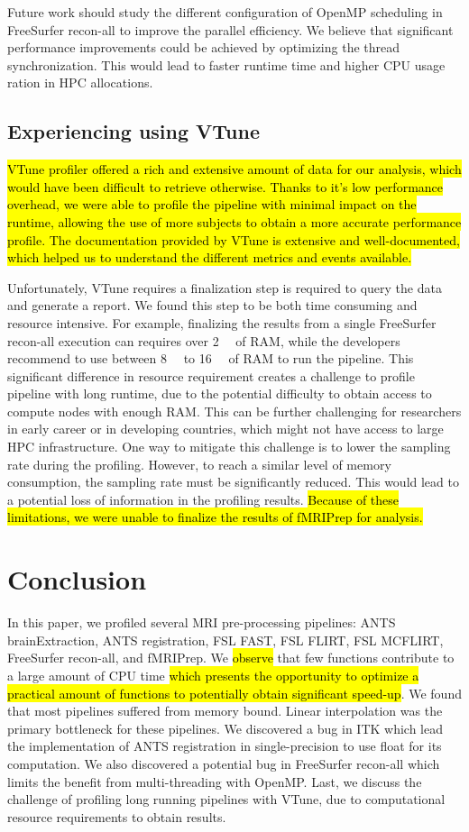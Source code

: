 \documentclass[conference]{IEEEtran}
\newcommand{\HL}[1]{\hl{#1}}
\begin{document}
Future work should study the different configuration of OpenMP scheduling in FreeSurfer recon-all to improve the parallel efficiency. We believe that significant performance improvements could be achieved by optimizing the thread synchronization. This would lead to faster runtime time and higher CPU usage ration in HPC allocations.

\subsection{Experiencing using VTune}
\HL{VTune profiler offered a rich and extensive amount of data for our analysis, which would have been difficult to retrieve otherwise. Thanks to it's low performance overhead, we were able to profile the pipeline with minimal impact on the runtime, allowing the use of more subjects to obtain a more accurate performance profile. The documentation provided by VTune is extensive and well-documented, which helped us to understand the different metrics and events available.}

Unfortunately, VTune requires a finalization step is required to query the data and generate a report. We found this step to be both time consuming and resource intensive. For example, finalizing the results from a single FreeSurfer recon-all execution can requires over \SI{2}{\tera\byte} of RAM, while the developers recommend to use between \SI{8}{\giga\byte} to \SI{16}{\giga\byte} of RAM to run the pipeline. This significant difference in resource requirement creates a challenge to profile pipeline with long runtime, due to the potential difficulty to obtain access to compute nodes with enough RAM. This can be further challenging for researchers in early career or in developing countries, which might not have access to large HPC infrastructure.
One way to mitigate this challenge is to lower the sampling rate during the profiling. However, to reach a similar level of memory consumption, the sampling rate must be significantly reduced. This would lead to a potential loss of information in the profiling results.
\HL{Because of these limitations, we were unable to finalize the results of fMRIPrep for analysis.}

\section{Conclusion}
In this paper, we profiled several MRI pre-processing pipelines: ANTS brainExtraction, ANTS registration, FSL FAST, FSL FLIRT, FSL MCFLIRT, FreeSurfer recon-all, and fMRIPrep. We \HL{observe} that few functions contribute to a large amount of CPU time \HL{which presents the opportunity to optimize a practical amount of functions to potentially obtain significant speed-up}. We found that most pipelines suffered from memory bound. Linear interpolation was the primary bottleneck for these pipelines. We discovered a bug in ITK which lead the implementation of ANTS registration in single-precision to use float for its computation. We also discovered a potential bug in FreeSurfer recon-all which limits the benefit from multi-threading with OpenMP. Last, we discuss the challenge of profiling long running pipelines with VTune, due to computational resource requirements to obtain results.
\end{document}
